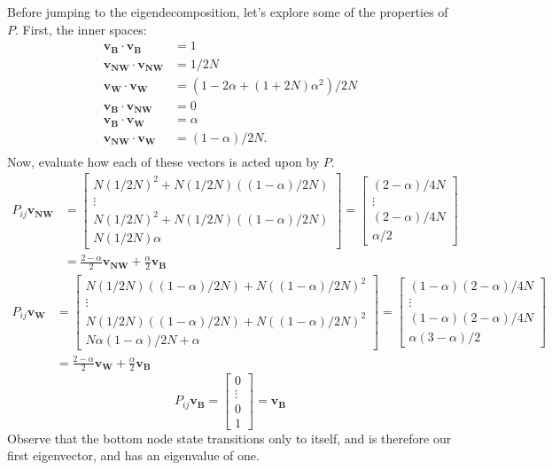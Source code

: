 \documentclass[11pt]{article}
\begin{document}
Before jumping to the eigendecomposition, let's explore some of the properties of $P$. First, the inner spaces:
\begin{align}
\mathbf{v_B}\cdot\mathbf{v_B} &= 1\\
\mathbf{v_{NW}}\cdot\mathbf{v_{NW}} &= 1/2N\\
\mathbf{v_W}\cdot\mathbf{v_W} &= (1 - 2\alpha + (1+2N)\alpha^2)/2N\\
\mathbf{v_B}\cdot\mathbf{v_{NW}} &= 0\\
\mathbf{v_B}\cdot\mathbf{v_W} &= \alpha\\
\mathbf{v_{NW}}\cdot\mathbf{v_W} &= (1-\alpha)/2N.\\
\end{align}
Now, evaluate how each of these vectors is acted upon by $P$.
\begin{align}
P_{ij}\mathbf{v_{NW}} &= \left[\begin{array}{c}
N(1/2N)^2 + N(1/2N)((1-\alpha)/2N)\\\vdots\\N(1/2N)^2 + N(1/2N)((1-\alpha)/2N)\\N(1/2N)\alpha
\end{array}\right] = \left[\begin{array}{c}
(2-\alpha)/4N\\\vdots\\(2-\alpha)/4N\\\alpha/2
\end{array}\right]\\ 
&= \frac{2-\alpha}{2}\mathbf{v_{NW}} + \frac{\alpha}{2}\mathbf{v_B}
\end{align}
\begin{align}
P_{ij}\mathbf{v_{W}} &= \left[\begin{array}{c}
N(1/2N)((1-\alpha)/2N) + N((1-\alpha)/2N)^2\\\vdots\\N(1/2N)((1-\alpha)/2N) + N((1-\alpha)/2N)^2\\N\alpha(1-\alpha)/2N + \alpha
\end{array}\right] = \left[\begin{array}{c}
(1-\alpha)(2-\alpha)/4N\\\vdots\\(1-\alpha)(2-\alpha)/4N\\ \alpha(3-\alpha)/2
\end{array}\right]\\ 
&=\frac{2-\alpha}{2}\mathbf{v_W} + \frac{\alpha}{2}\mathbf{v_B}\label{eq:Pvw}
\end{align}
\begin{equation}\label{eq:Pvb}
P_{ij}\mathbf{v_B} = \left[\begin{array}{c}
0\\\vdots\\0\\1
\end{array}\right] = \mathbf{v_B}
\end{equation}
Observe that the bottom node state transitions only to itself, and is therefore our first eigenvector, and has an eigenvalue of one.
\end{document}
